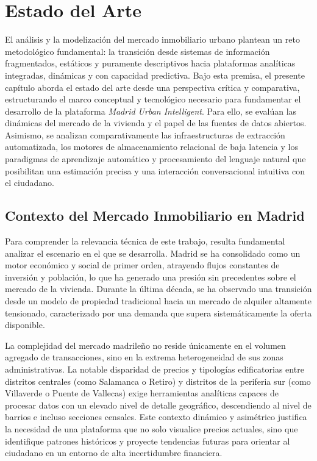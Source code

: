 \documentclass[a4paper,11pt,openany]{book}
\begin{document}
\chapter{Estado del Arte}
El análisis y la modelización del mercado inmobiliario urbano plantean un reto metodológico fundamental: la transición desde sistemas de información fragmentados, estáticos y puramente descriptivos hacia plataformas analíticas integradas, dinámicas y con capacidad predictiva. Bajo esta premisa, el presente capítulo aborda el estado del arte desde una perspectiva crítica y comparativa, estructurando el marco conceptual y tecnológico necesario para fundamentar el desarrollo de la plataforma \textit{Madrid Urban Intelligent}. Para ello, se evalúan las dinámicas del mercado de la vivienda y el papel de las fuentes de datos abiertos. Asimismo, se analizan comparativamente las infraestructuras de extracción automatizada, los motores de almacenamiento relacional de baja latencia y los paradigmas de aprendizaje automático y procesamiento del lenguaje natural que posibilitan una estimación precisa y una interacción conversacional intuitiva con el ciudadano.

\section{Contexto del Mercado Inmobiliario en Madrid}
Para comprender la relevancia técnica de este trabajo, resulta fundamental analizar el escenario en el que se desarrolla. Madrid se ha consolidado como un motor económico y social de primer orden, atrayendo flujos constantes de inversión y población, lo que ha generado una presión sin precedentes sobre el mercado de la vivienda. Durante la última década, se ha observado una transición desde un modelo de propiedad tradicional hacia un mercado de alquiler altamente tensionado, caracterizado por una demanda que supera sistemáticamente la oferta disponible.

La complejidad del mercado madrileño no reside únicamente en el volumen agregado de transacciones, sino en la extrema heterogeneidad de sus zonas administrativas. La notable disparidad de precios y tipologías edificatorias entre distritos centrales (como Salamanca o Retiro) y distritos de la periferia sur (como Villaverde o Puente de Vallecas) exige herramientas analíticas capaces de procesar datos con un elevado nivel de detalle geográfico, descendiendo al nivel de barrios e incluso secciones censales. Este contexto dinámico y asimétrico justifica la necesidad de una plataforma que no solo visualice precios actuales, sino que identifique patrones históricos y proyecte tendencias futuras para orientar al ciudadano en un entorno de alta incertidumbre financiera.
\end{document}
